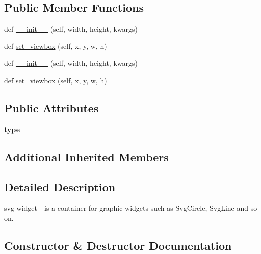 \subsection*{Public Member Functions}
\begin{DoxyCompactItemize}
\item 
def \hyperlink{classremi_1_1gui_1_1Svg_a69e6ef36206f4bf205ec264aaa446649}{\+\_\+\+\_\+init\+\_\+\+\_\+} (self, width, height, kwargs)
\item 
def \hyperlink{classremi_1_1gui_1_1Svg_a6ffc7d6b9bed0f4b4ffbc77f89331d3c}{set\+\_\+viewbox} (self, x, y, w, h)
\item 
def \hyperlink{classremi_1_1gui_1_1Svg_a69e6ef36206f4bf205ec264aaa446649}{\+\_\+\+\_\+init\+\_\+\+\_\+} (self, width, height, kwargs)
\item 
def \hyperlink{classremi_1_1gui_1_1Svg_a6ffc7d6b9bed0f4b4ffbc77f89331d3c}{set\+\_\+viewbox} (self, x, y, w, h)
\end{DoxyCompactItemize}
\subsection*{Public Attributes}
\begin{DoxyCompactItemize}
\item 
{\bfseries type}\hypertarget{classremi_1_1gui_1_1Svg_a99a4be72b046f7658dfaab7febd85afe}{}\label{classremi_1_1gui_1_1Svg_a99a4be72b046f7658dfaab7febd85afe}

\end{DoxyCompactItemize}
\subsection*{Additional Inherited Members}


\subsection{Detailed Description}
\begin{DoxyVerb}svg widget - is a container for graphic widgets such as SvgCircle, SvgLine and so on.\end{DoxyVerb}
 

\subsection{Constructor \& Destructor Documentation}

